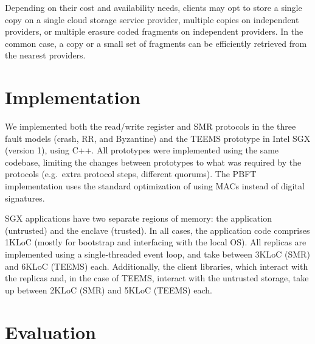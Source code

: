 Depending on their cost and availability needs, clients may opt to
store a single copy on a single cloud storage service provider,
multiple copies on independent providers, or multiple erasure coded
fragments on independent providers. In the common case, a copy or a
small set of fragments can be efficiently retrieved from the nearest
providers.


\section{Implementation}\label{sec:impl}


We implemented both the read/write register and SMR
protocols in the three fault models (crash, \ac{RR}, and
Byzantine) and the \ac{TEEMS} prototype in Intel SGX (version
1), using C++. All prototypes were implemented using the
same codebase, limiting the changes between prototypes to what
was required by the protocols (e.g.\ extra protocol steps,
different quorums). The PBFT implementation uses the standard
optimization of using MACs instead of digital signatures.

SGX applications have two separate regions of memory: the
application (untrusted) and the enclave (trusted). In all cases,
the application code comprises 1KLoC (mostly for bootstrap and
interfacing with the local OS). All replicas are implemented
using a single-threaded event loop, and take between 3KLoC (SMR)
and 6KLoC (\ac{TEEMS}) each. Additionally, the client libraries, which
interact with the replicas and, in the case of \ac{TEEMS}, interact
with the untrusted storage, take up between 2KLoC (SMR) and 5KLoC
(\ac{TEEMS}) each.


\section{Evaluation}\label{sec:eval}

